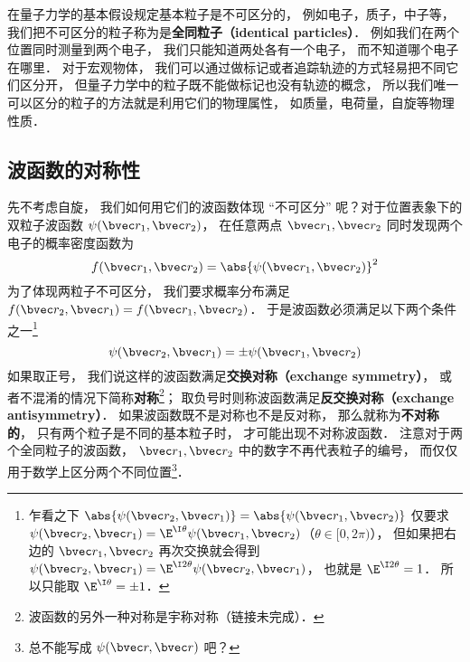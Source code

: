 

在量子力学的基本假设规定基本粒子是不可区分的， 例如电子，质子，中子等， 我们把不可区分的粒子称为是\textbf{全同粒子（identical particles）}． 例如我们在两个位置同时测量到两个电子， 我们只能知道两处各有一个电子， 而不知道哪个电子在哪里． 对于宏观物体， 我们可以通过做标记或者追踪轨迹的方式轻易把不同它们区分开， 但量子力学中的粒子既不能做标记也没有轨迹的概念， 所以我们唯一可以区分的粒子的方法就是利用它们的物理属性， 如质量，电荷量，自旋等物理性质．

\subsection{波函数的对称性}
先不考虑自旋， 我们如何用它们的波函数体现 “不可区分” 呢？对于位置表象下的双粒子波函数 $\psi(\bvec r_1, \bvec r_2)$， 在任意两点 $\bvec r_1, \bvec r_2$ 同时发现两个电子的概率密度函数为%
\begin{equation}
f(\bvec r_1, \bvec r_2) = \abs{\psi(\bvec r_1, \bvec r_2)}^2
\end{equation}
为了体现两粒子不可区分， 我们要求概率分布满足 $f(\bvec r_2, \bvec r_1) = f(\bvec r_1, \bvec r_2)$． 于是波函数必须满足以下两个条件之一\footnote{乍看之下 $\abs{\psi(\bvec r_2, \bvec r_1)} = \abs{\psi(\bvec r_1, \bvec r_2)}$ 仅要求 $\psi(\bvec r_2, \bvec r_1) = \E^{\I \theta} \psi(\bvec r_1, \bvec r_2)$（$\theta \in [0, 2\pi)$）， 但如果把右边的 $\bvec r_1, \bvec r_2$ 再次交换就会得到 $\psi(\bvec r_2, \bvec r_1) = \E^{\I 2\theta} \psi(\bvec r_2, \bvec r_1)$， 也就是 $\E^{\I2\theta} = 1$． 所以只能取 $\E^{\I\theta} = \pm 1$．}
\begin{equation}\label{IdPar_eq5}
\psi(\bvec r_2, \bvec r_1) = \pm \psi(\bvec r_1, \bvec r_2)
\end{equation}
如果取正号， 我们说这样的波函数满足\textbf{交换对称（exchange symmetry）}， 或者不混淆的情况下简称\textbf{对称}\footnote{波函数的另外一种对称是宇称对称（链接未完成）．}； 取负号时则称波函数满足\textbf{反交换对称（exchange antisymmetry）}． 如果波函数既不是对称也不是反对称， 那么就称为\textbf{不对称的}， 只有两个粒子是不同的基本粒子时， 才可能出现不对称波函数． 注意对于两个全同粒子的波函数， $\bvec r_1, \bvec r_2$ 中的数字不再代表粒子的编号， 而仅仅用于数学上区分两个不同位置\footnote{总不能写成 $\psi(\bvec r, \bvec r)$ 吧？}．

